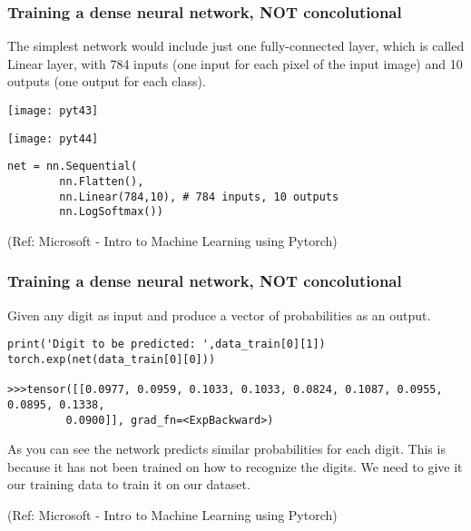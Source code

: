 \begin{frame}[fragile] \frametitle{Training a dense neural network, NOT concolutional}

The simplest network would include just one fully-connected layer, which is called Linear layer, with 784 inputs (one input for each pixel of the input image) and 10 outputs (one output for each class).

\begin{center}
\texttt{[image: pyt43]}

\texttt{[image: pyt44]}

\end{center}



\begin{lstlisting}
net = nn.Sequential(
        nn.Flatten(), 
        nn.Linear(784,10), # 784 inputs, 10 outputs
        nn.LogSoftmax())
\end{lstlisting}

\tiny{(Ref: Microsoft - Intro to Machine Learning using Pytorch)}
\end{frame}

\begin{frame}[fragile] \frametitle{Training a dense neural network, NOT concolutional}


Given any digit as input and produce a vector of probabilities as an output.


\begin{lstlisting}
print('Digit to be predicted: ',data_train[0][1])
torch.exp(net(data_train[0][0]))

>>>tensor([[0.0977, 0.0959, 0.1033, 0.1033, 0.0824, 0.1087, 0.0955, 0.0895, 0.1338,
         0.0900]], grad_fn=<ExpBackward>)
\end{lstlisting}

As you can see the network predicts similar probabilities for each digit. This is because it has not been trained on how to recognize the digits. We need to give it our training data to train it on our dataset.

\tiny{(Ref: Microsoft - Intro to Machine Learning using Pytorch)}
\end{frame}

